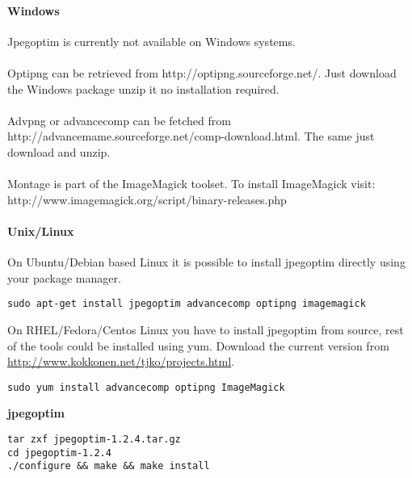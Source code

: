 \paragraph{Windows\\}
\noindent Jpegoptim is currently not available on Windows systems.\\
\\
Optipng can be retrieved from http://optipng.sourceforge.net/. Just download the Windows package unzip it no installation required.\\
\\
Advpng or advancecomp can be fetched from http://advancemame.sourceforge.net/comp-download.html. The same just download and unzip.\\
\\
Montage is part of the ImageMagick toolset. To install ImageMagick visit:\\
http://www.imagemagick.org/script/binary-releases.php \\

\paragraph{Unix/Linux\\}
On Ubuntu/Debian based Linux it is possible to install jpegoptim directly using your package manager.\\

\begin{verbatim}
sudo apt-get install jpegoptim advancecomp optipng imagemagick
\end{verbatim}

\noindent On RHEL/Fedora/Centos Linux you have to install jpegoptim from source, rest of the tools could be installed using yum. Download the current version from \url{http://www.kokkonen.net/tjko/projects.html}. \\


\begin{verbatim}
sudo yum install advancecomp optipng ImageMagick
\end{verbatim}

\noindent \textbf{jpegoptim}
\begin{verbatim}
tar zxf jpegoptim-1.2.4.tar.gz
cd jpegoptim-1.2.4
./configure && make && make install
\end{verbatim}


